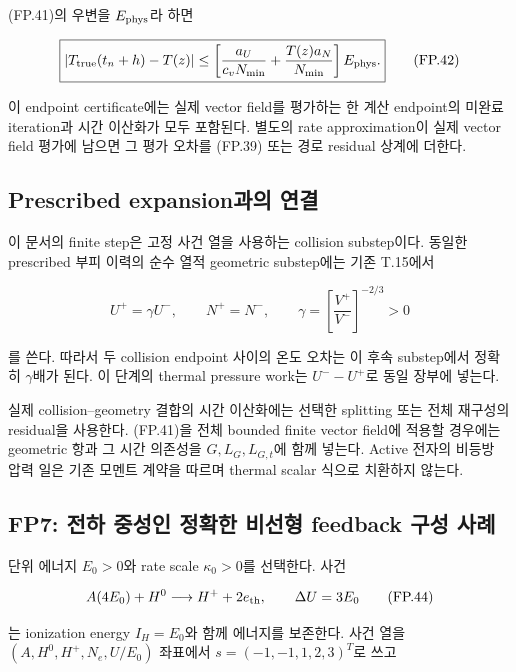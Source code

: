 (FP.41)의 우변을 \(E_{\rm phys}\)라 하면

\[
\boxed{
|T_{\rm true}(t_n+h)-T(z)|
\le
\left[
\frac{a_U}{c_vN_{\min}}
+\frac{T(z)a_N}{N_{\min}}
\right]E_{\rm phys}.
}
\tag{FP.42}
\]

이 endpoint certificate에는 실제 vector field를 평가하는 한 계산 endpoint의 미완료 iteration과 시간 이산화가 모두 포함된다. 별도의 rate approximation이 실제 vector field 평가에 남으면 그 평가 오차를 (FP.39) 또는 경로 residual 상계에 더한다.

\hypertarget{prescribed-expansionuxacfcuxc758-uxc5f0uxacb0}{%
\subsection{Prescribed expansion과의 연결}\label{prescribed-expansionuxacfcuxc758-uxc5f0uxacb0}}

이 문서의 finite step은 고정 사건 열을 사용하는 collision substep이다. 동일한 prescribed 부피 이력의 순수 열적 geometric substep에는 기존 T.15에서

\[
U^+=\gamma U^-,\qquad N^+=N^-,\qquad
\gamma=\left[\frac{V^+}{V^-}\right]^{-2/3}>0
\tag{FP.43}
\]

를 쓴다. 따라서 두 collision endpoint 사이의 온도 오차는 이 후속 substep에서 정확히 \(\gamma\)배가 된다. 이 단계의 thermal pressure work는 \(U^--U^+\)로 동일 장부에 넣는다.

실제 collision--geometry 결합의 시간 이산화에는 선택한 splitting 또는 전체 재구성의 residual을 사용한다. (FP.41)을 전체 bounded finite vector field에 적용할 경우에는 geometric 항과 그 시간 의존성을 \(G,L_G,L_{G,t}\)에 함께 넣는다. Active 전자의 비등방 압력 일은 기존 모멘트 계약을 따르며 thermal scalar 식으로 치환하지 않는다.

\hypertarget{fp7-uxc804uxd558-uxc911uxc131uxc778-uxc815uxd655uxd55c-uxbe44uxc120uxd615-feedback-uxad6cuxc131-uxc0acuxb840}{%
\subsection{FP7: 전하 중성인 정확한 비선형 feedback 구성 사례}\label{fp7-uxc804uxd558-uxc911uxc131uxc778-uxc815uxd655uxd55c-uxbe44uxc120uxd615-feedback-uxad6cuxc131-uxc0acuxb840}}

단위 에너지 \(E_0>0\)와 rate scale \(\kappa_0>0\)를 선택한다. 사건

\[
A(4E_0)+H^0\longrightarrow H^++2e_{\rm th},
\qquad \Delta U=3E_0
\tag{FP.44}
\]

는 ionization energy \(I_H=E_0\)와 함께 에너지를 보존한다. 사건 열을 \((A,H^0,H^+,N_e,U/E_0)\) 좌표에서 \(s=(-1,-1,1,2,3)^T\)로 쓰고


